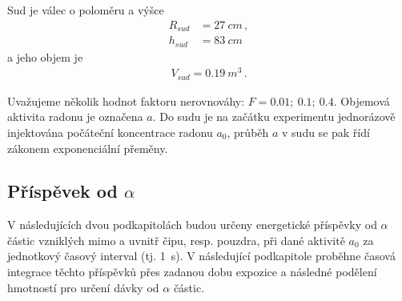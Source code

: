 \documentclass[11pt,a4paper]{article}
\begin{document}
Sud je válec o poloměru a výšce
\begin{align}
R_{sud}&=\SI{27}{cm}\,,\\
h_{sud}&=\SI{83}{cm}\,
\end{align}
a jeho objem je
\begin{align}
	V_{sud}=\SI{0,19}{m^3}\,.
\end{align}

Uvažujeme několik hodnot faktoru nerovnováhy: $F=\num{0,01};\ \num{0,1};\ \num{0,4}$. Objemová aktivita radonu je označena $a$. Do sudu je na začátku experimentu jednorázově injektována počáteční koncentrace radonu $a_0$, průběh $a$ v sudu se pak řídí zákonem exponenciální přeměny.
\subsection{Příspěvek od $\alpha$}
V následujících dvou podkapitolách budou určeny energetické příspěvky od $\alpha$ částic vzniklých mimo a uvnitř čipu, resp. pouzdra, při dané aktivitě $a_0$ za jednotkový časový interval (tj. \SI{1}{s}). V následující podkapitole proběhne časová integrace těchto příspěvků přes zadanou dobu expozice a následné podělení hmotností pro určení dávky od $\alpha$ částic.
\end{document}
